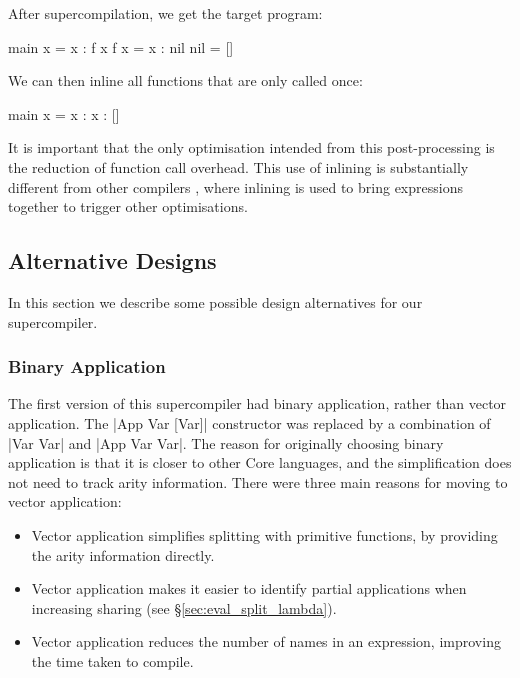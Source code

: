 \documentclass[draft]{sigplanconf}
\begin{document}
\noindent After supercompilation, we get the target program:

\begin{code}
main x = x : f x
f x = x : nil
nil = []
\end{code}

\noindent We can then inline all functions that are only called once:

\begin{code}
main x = x : x : []
\end{code}

It is important that the only optimisation intended from this post-processing is the reduction of function call overhead. This use of inlining is substantially different from other compilers \cite{spj:inlining}, where inlining is used to bring expressions together to trigger other optimisations.

\subsection{Alternative Designs}
\label{sec:extensions}

In this section we describe some possible design alternatives for our supercompiler.

\subsubsection{Binary Application}
\label{sec:binaryapp}

The first version of this supercompiler had binary application, rather than vector application. The |App Var [Var]| constructor was replaced by a combination of |Var Var| and |App Var Var|. The reason for originally choosing binary application is that it is closer to other Core languages, and the simplification does not need to track arity information. There were three main reasons for moving to vector application:

\begin{itemize}
\item Vector application simplifies splitting with primitive functions, by providing the arity information directly.
\item Vector application makes it easier to identify partial applications when increasing sharing (see \S\ref{sec:eval_split_lambda}).
\item Vector application reduces the number of names in an expression, improving the time taken to compile.
\end{itemize}
\end{document}
